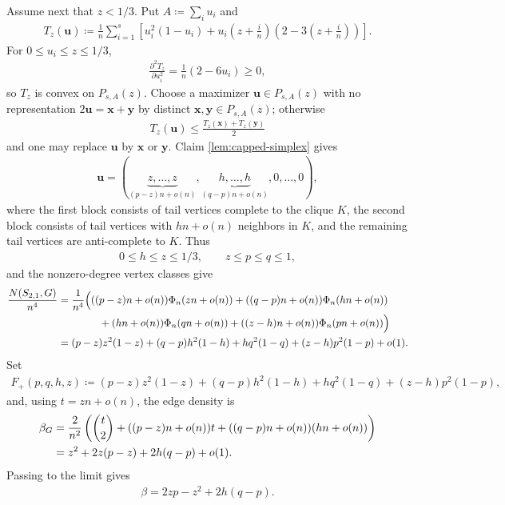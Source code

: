 \documentclass[10pt,a4paper]{article}
\begin{document}
    Assume next that $z<1/3$.  Put $A\coloneqq\sum_i u_i$ and
    \begin{align*}
      T_z(\mathbf{u})\coloneqq
      \frac1n\sum_{i=1}^s\left[u_i^2(1-u_i)
      +u_i\left(z+\frac{i}{n}\right)\left(2-3\left(z+\frac{i}{n}\right)\right)\right].
    \end{align*}
    For $0\le u_i\le z\le1/3$,
    \begin{align*}
      \frac{\partial^2 T_z}{\partial u_i^2}=\frac1n(2-6u_i)\ge0,
    \end{align*}
    so $T_z$ is convex on $P_{s,A}(z)$.  Choose a maximizer
    $\mathbf{u}\in P_{s,A}(z)$ with no representation
    $2\mathbf{u}=\mathbf{x}+\mathbf{y}$ by distinct
    $\mathbf{x},\mathbf{y}\in P_{s,A}(z)$; otherwise
    \begin{align*}
      T_z(\mathbf{u})\le \frac{T_z(\mathbf{x})+T_z(\mathbf{y})}2
    \end{align*}
    and one may replace $\mathbf{u}$ by $\mathbf{x}$ or $\mathbf{y}$.  Claim
    \ref{lem:capped-simplex} gives
    \begin{align*}
      \mathbf{u}=(\underbrace{z,\ldots,z}_{(p-z)n+o(n)},
      \underbrace{h,\ldots,h}_{(q-p)n+o(n)},0,\ldots,0),
    \end{align*}
    where the first block consists of tail vertices complete to the clique $K$, the
    second block consists of tail vertices with $hn+o(n)$ neighbors in $K$, and the
    remaining tail vertices are anti-complete to $K$.  Thus
    \begin{align*}
      0\le h\le z\le1/3,
      \qquad
      z\le p\le q\le1,
    \end{align*}
    and the nonzero-degree vertex classes give
    \begin{align*}
      \frac{N(S_{2,1},G)}{n^4}
      &=
      \frac{1}{n^4}\Bigl(((p-z)n+o(n))\Phi_n(zn+o(n))
      +((q-p)n+o(n))\Phi_n(hn+o(n))\\
      &\qquad\qquad
      +(hn+o(n))\Phi_n(qn+o(n))
      +((z-h)n+o(n))\Phi_n(pn+o(n))\Bigr)\\
      &=(p-z)z^2(1-z)+(q-p)h^2(1-h)+hq^2(1-q)
      +(z-h)p^2(1-p)+o(1).
    \end{align*}
    Set
    \begin{align}\label{eq:Fplus}
      F_+(p,q,h,z)\coloneqq
      (p-z)z^2(1-z)+(q-p)h^2(1-h)+hq^2(1-q)+(z-h)p^2(1-p),
    \end{align}
    and, using $t=zn+o(n)$, the edge density is
    \begin{align}\label{eq:Fplus-beta}
      \beta_G
      &=\frac{2}{n^2}\left(\binom{t}{2}
      +((p-z)n+o(n))t+((q-p)n+o(n))(hn+o(n))\right)\notag\\
      &=z^2+2z(p-z)+2h(q-p)+o(1).
    \end{align}
    Passing to the limit gives
    \begin{align*}
      \beta=2zp-z^2+2h(q-p).
    \end{align*}
    
\end{document}
